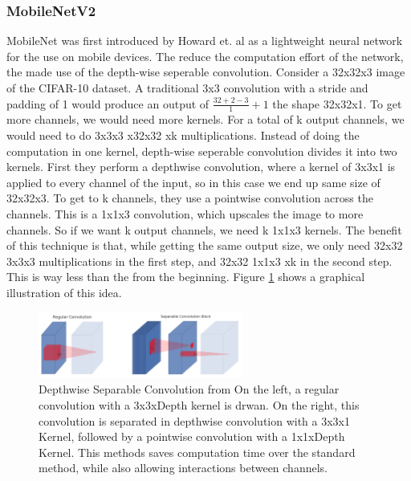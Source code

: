 \subsubsection{MobileNetV2}
MobileNet was first introduced by Howard et. al \cite{howard2017mobilenets} as a
lightweight neural network for the use on mobile devices. The reduce the
computation effort of the network, the made use of the depth-wise seperable
convolution. Consider a 32x32x3 image of the CIFAR-10 dataset. A traditional 3x3
convolution with a stride and padding of 1 would produce an output of
$\frac{32+2-3}{1}+1$ the shape 32x32x1. To get more channels, we would need more
kernels. For a total of k output channels, we would need to do 3x3x3 x32x32 xk
multiplications. Instead of doing the computation in one kernel, depth-wise
seperable convolution divides it into two kernels. First they perform a
depthwise convolution, where a kernel of 3x3x1 is applied to every channel of
the input, so in this case we end up same size of 32x32x3. To get to k channels,
they use a pointwise convolution across the channels. This is a 1x1x3
convolution, which upscales the image to more channels. So if we want k output
channels, we need k 1x1x3 kernels. The benefit of this technique is that, while
getting the same output size, we only need 32x32 3x3x3 multiplications in the
first step, and 32x32 1x1x3 xk in the second step. This is way less than the
from the beginning. Figure \ref{fig:DSConv} shows a graphical illustration of
this idea.
\begin{figure}[h!]\label{fig:DSConv}
    \centering
    \includegraphics[width=0.6\textwidth]{images/Depthwise_Separable_Convolution.png}
    \caption{Depthwise Separable Convolution from \cite[Page 3]{sandler2018mobilenetv2} \newline On the left,
     a regular convolution with a 3x3xDepth kernel is drwan. On the right, this
     convolution is separated in depthwise convolution with a 3x3x1 Kernel,
     followed by a pointwise convolution with a 1x1xDepth Kernel. This methods
     saves computation time over the standard method, while also allowing
     interactions between channels.}
\end{figure}


